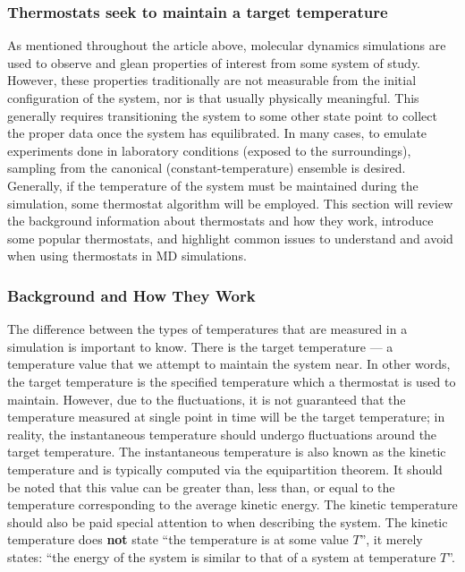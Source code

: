 \documentclass[9pt,bestpractices]{livecoms}
\begin{document}
\subsubsection{Thermostats seek to maintain a target temperature}
As mentioned throughout the article above, molecular dynamics simulations are used to observe and glean properties of interest from some system of
study.
However, these properties traditionally are not measurable from the initial configuration of the system, nor is that usually physically meaningful.
This generally requires transitioning the system to some other state point to collect the proper data once the system has equilibrated.
In many cases, to emulate experiments done in laboratory conditions (exposed to the surroundings), sampling from the canonical (constant-temperature) ensemble is desired\cite{thermostatAlgorithms2005}.
Generally, if the temperature of the system must be maintained during the simulation, some thermostat algorithm will be employed. 
This section will review the background information about thermostats and how they work, introduce some popular thermostats, and highlight common issues to understand and avoid when using thermostats in MD simulations.

\subsubsection{Background and How They Work}
The difference between the types of temperatures that are measured in a simulation is important to know.
There is the target temperature --- a temperature value that we attempt to maintain the system near.
In other words, the target temperature is the specified temperature which a thermostat is used to maintain.
However, due to the fluctuations, it is not guaranteed that the temperature measured at single point in time will be the target temperature; in reality, the instantaneous temperature should undergo fluctuations around the target temperature.
The instantaneous temperature is also known as the kinetic temperature and is typically computed via the equipartition theorem.
It should be noted that this value can be greater than, less than, or equal to the temperature corresponding to the average kinetic energy.
The kinetic temperature should also be paid special attention to when describing the system.
The kinetic temperature does \textbf{not} state ``the temperature is at some value $T$'', it merely states: ``the energy of the system is similar to that
of a system at temperature $T$''.
\end{document}
